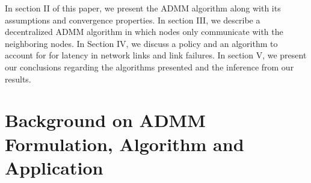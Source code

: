 \documentclass[letterpaper, 10 pt, conference]{ieeeconf}  %
\begin{document}

In section II of this paper, we present the ADMM algorithm along with its assumptions and  convergence properties. In section III, we describe a decentralized ADMM algorithm in which nodes only communicate with the neighboring nodes. In Section IV, we discuss a policy and an algorithm to account for for latency in network links and link failures. In section V, we present our conclusions regarding the algorithms presented and the inference from our results.

\section{ Background on ADMM Formulation, Algorithm and Application} \label{ADMM_section}
\end{document}

